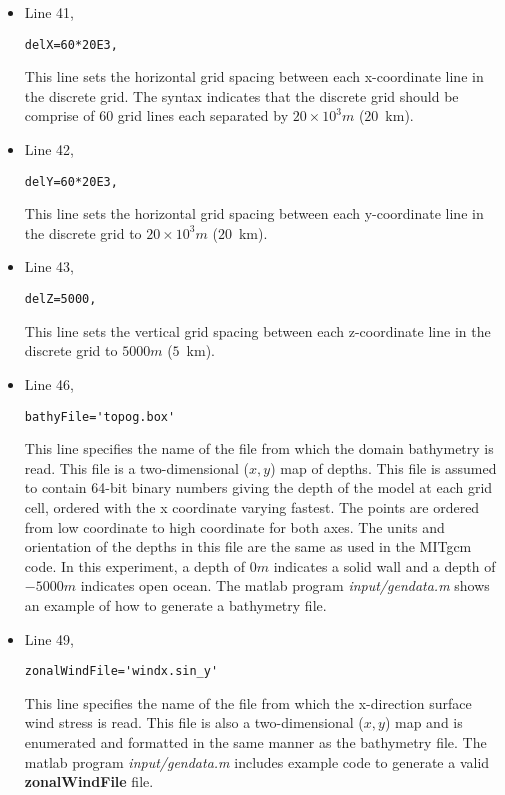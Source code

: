 \begin{itemize}
\item Line 41,
\begin{verbatim}
delX=60*20E3,
\end{verbatim}
This line sets the horizontal grid spacing between each x-coordinate line
in the discrete grid. The syntax indicates that the discrete grid
should be comprise of $60$ grid lines each separated by $20 \times 10^{3}m$
($20$~km).

\item Line 42,
\begin{verbatim}
delY=60*20E3,
\end{verbatim}
This line sets the horizontal grid spacing between each y-coordinate line
in the discrete grid to $20 \times 10^{3}m$ ($20$~km).

\item Line 43,
\begin{verbatim}
delZ=5000,
\end{verbatim}
This line sets the vertical grid spacing between each z-coordinate line
in the discrete grid to $5000m$ ($5$~km).

\item Line 46,
\begin{verbatim}
bathyFile='topog.box'
\end{verbatim}
This line specifies the name of the file from which the domain
bathymetry is read. This file is a two-dimensional ($x,y$) map of
depths. This file is assumed to contain 64-bit binary numbers 
giving the depth of the model at each grid cell, ordered with the x 
coordinate varying fastest. The points are ordered from low coordinate
to high coordinate for both axes. The units and orientation of the
depths in this file are the same as used in the MITgcm code. In this
experiment, a depth of $0m$ indicates a solid wall and a depth
of $-5000m$ indicates open ocean. The matlab program
{\it input/gendata.m} shows an example of how to generate a
bathymetry file.


\item Line 49,
\begin{verbatim}
zonalWindFile='windx.sin_y'
\end{verbatim}
This line specifies the name of the file from which the x-direction
surface wind stress is read. This file is also a two-dimensional
($x,y$) map and is enumerated and formatted in the same manner as the 
bathymetry file. The matlab program {\it input/gendata.m} includes example 
code to generate a valid {\bf zonalWindFile} file.  

\end{itemize}

